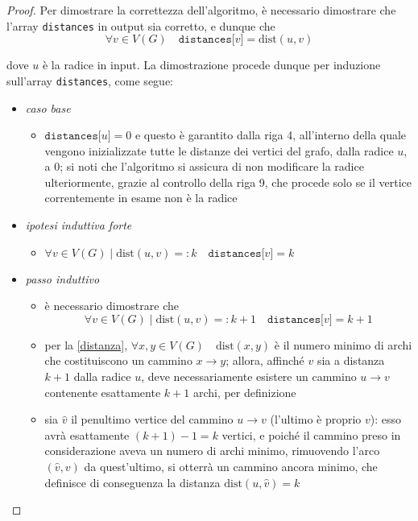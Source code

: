 \documentclass[a4paper, 12pt]{report}
\begin{document}
    \begin{proof}
        Per dimostrare la correttezza dell'algoritmo, è necessario dimostrare che l'array \texttt{distances} in output sia corretto, e dunque che $$\forall v \in V(G) \quad \texttt{distances[}v\texttt{]} = \mathrm{dist}(u, v)$$

        dove $u$ è la radice in input. La dimostrazione procede dunque per induzione sull'array \texttt{distances}, come segue:

        \begin{itemize}
            \item \textit{caso base}
                \begin{itemize}
                    \item $\texttt{distances[}u\texttt{]} = 0$ e questo è garantito dalla riga 4, all'interno della quale vengono inizializzate tutte le distanze dei vertici del grafo, dalla radice $u$, a 0; si noti che l'algoritmo si assicura di non modificare la radice ulteriormente, grazie al controllo della riga 9, che procede solo se il vertice correntemente in esame non è la radice
                \end{itemize}
            \item \textit{ipotesi induttiva forte}
                \begin{itemize}
                    \item $\forall v \in V(G) \mid \mathrm{dist}(u, v) =: k \quad \texttt{distances[}v\texttt{]} = k$
                \end{itemize}
            \item \textit{passo induttivo}
                \begin{itemize}
                    \item è necessario dimostrare che $$\forall v \in V(G) \mid \mathrm{dist}(u, v) =: k + 1 \quad \texttt{distances[}v\texttt{]} = k + 1$$
                    \item per la \cref{distanza}, $\forall x, y \in V(G) \quad \mathrm{dist}(x, y)$ è il numero minimo di archi che costituiscono un cammino $x \rightarrow y$; allora, affinché $v$ sia a distanza $k + 1$ dalla radice $u$, deve necessariamente esistere un cammino $u \rightarrow v$ contenente esattamente $k + 1$ archi, per definizione
                    \item sia $\hat v$ il penultimo vertice del cammino $u \rightarrow v$ (l'ultimo è proprio $v$): esso avrà esattamente $(k + 1) - 1 = k$ vertici, e poiché il cammino preso in considerazione aveva un numero di archi minimo, rimuovendo l'arco $(\hat v, v)$ da quest'ultimo, si otterrà un cammino ancora minimo, che definisce di conseguenza la distanza $\mathrm{dist}(u, \hat v) = k$

\end{itemize}
\end{itemize}
\end{proof}
\end{document}
